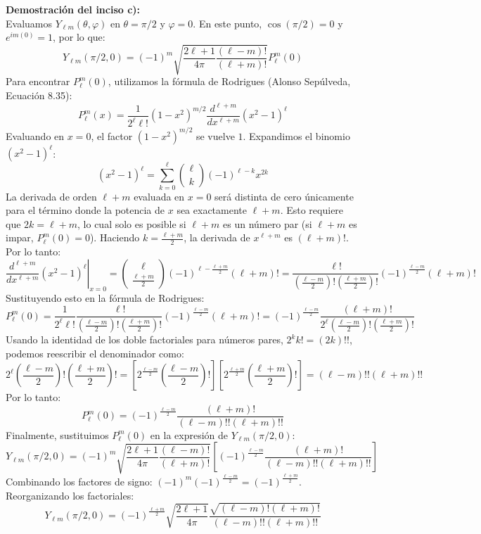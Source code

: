 \documentclass[a4paper]{article}
\begin{document}
\vspace{0.3cm}
\noindent\textbf{Demostración del inciso c):} \\
Evaluamos $Y_{\ell m}(\theta, \varphi)$ en $\theta = \pi/2$ y $\varphi = 0$. En este punto, $\cos(\pi/2) = 0$ y $e^{im(0)} = 1$, por lo que:
$$
Y_{\ell m}(\pi/2, 0) = (-1)^m \sqrt{\frac{2\ell+1}{4\pi} \frac{(\ell-m)!}{(\ell+m)!}} P_\ell^m(0)
$$
Para encontrar $P_\ell^m(0)$, utilizamos la fórmula de Rodrigues (Alonso Sepúlveda, Ecuación 8.35):
$$
P_\ell^m(x) = \frac{1}{2^\ell \ell!} (1-x^2)^{m/2} \frac{d^{\ell+m}}{dx^{\ell+m}} (x^2-1)^\ell
$$
Evaluando en $x=0$, el factor $(1-x^2)^{m/2}$ se vuelve $1$. Expandimos el binomio $(x^2-1)^\ell$:
$$
(x^2-1)^\ell = \sum_{k=0}^\ell \binom{\ell}{k} (-1)^{\ell-k} x^{2k}
$$
La derivada de orden $\ell+m$ evaluada en $x=0$ será distinta de cero únicamente para el término donde la potencia de $x$ sea exactamente $\ell+m$. Esto requiere que $2k = \ell+m$, lo cual solo es posible si $\ell+m$ es un número par (si $\ell+m$ es impar, $P_\ell^m(0) = 0$). 
Haciendo $k = \frac{\ell+m}{2}$, la derivada de $x^{\ell+m}$ es $(\ell+m)!$. Por lo tanto:
$$
\left. \frac{d^{\ell+m}}{dx^{\ell+m}} (x^2-1)^\ell \right|_{x=0} = \binom{\ell}{\frac{\ell+m}{2}} (-1)^{\ell - \frac{\ell+m}{2}} (\ell+m)! = \frac{\ell!}{\left(\frac{\ell-m}{2}\right)! \left(\frac{\ell+m}{2}\right)!} (-1)^{\frac{\ell-m}{2}} (\ell+m)!
$$
Sustituyendo esto en la fórmula de Rodrigues:
$$
P_\ell^m(0) = \frac{1}{2^\ell \ell!} \frac{\ell!}{\left(\frac{\ell-m}{2}\right)! \left(\frac{\ell+m}{2}\right)!} (-1)^{\frac{\ell-m}{2}} (\ell+m)! = (-1)^{\frac{\ell-m}{2}} \frac{(\ell+m)!}{2^\ell \left(\frac{\ell-m}{2}\right)! \left(\frac{\ell+m}{2}\right)!}
$$
Usando la identidad de los doble factoriales para números pares, $2^k k! = (2k)!!$, podemos reescribir el denominador como:
$$
2^\ell \left(\frac{\ell-m}{2}\right)! \left(\frac{\ell+m}{2}\right)! = \left[ 2^{\frac{\ell-m}{2}} \left(\frac{\ell-m}{2}\right)! \right] \left[ 2^{\frac{\ell+m}{2}} \left(\frac{\ell+m}{2}\right)! \right] = (\ell-m)!! (\ell+m)!!
$$
Por lo tanto:
$$
P_\ell^m(0) = (-1)^{\frac{\ell-m}{2}} \frac{(\ell+m)!}{(\ell-m)!! (\ell+m)!!}
$$
Finalmente, sustituimos $P_\ell^m(0)$ en la expresión de $Y_{\ell m}(\pi/2, 0)$:
$$
Y_{\ell m}(\pi/2, 0) = (-1)^m \sqrt{\frac{2\ell+1}{4\pi} \frac{(\ell-m)!}{(\ell+m)!}} \left[ (-1)^{\frac{\ell-m}{2}} \frac{(\ell+m)!}{(\ell-m)!! (\ell+m)!!} \right]
$$
Combinando los factores de signo: $(-1)^m (-1)^{\frac{\ell-m}{2}} = (-1)^{\frac{\ell+m}{2}}$. Reorganizando los factoriales:
$$
Y_{\ell m}(\pi/2, 0) = (-1)^{\frac{\ell+m}{2}} \sqrt{\frac{2\ell+1}{4\pi}} \frac{\sqrt{(\ell-m)! (\ell+m)!}}{(\ell-m)!! (\ell+m)!!}
$$
\end{document}
